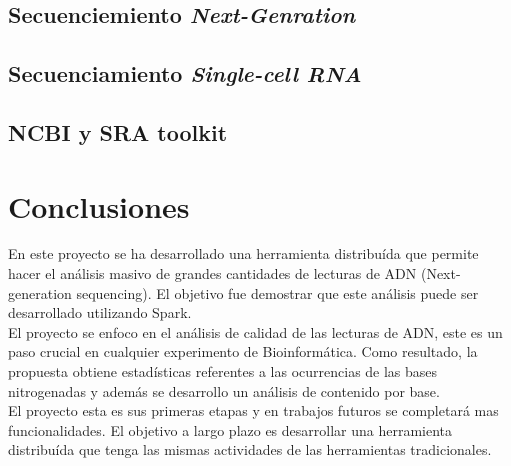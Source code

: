 \documentclass{article}
\begin{document}
\subsection{Secuenciemiento \textit{Next-Genration}}

\subsection{ Secuenciamiento \textit{Single-cell RNA}}

\subsection{NCBI y SRA toolkit}
	




\section{Conclusiones}

En este proyecto se ha desarrollado una herramienta distribuída que permite hacer el análisis masivo de grandes cantidades de lecturas de ADN (Next-generation sequencing). El objetivo fue demostrar que este análisis puede ser desarrollado utilizando Spark. \\

El proyecto se enfoco en el análisis de calidad de las lecturas de ADN, este es un paso crucial en cualquier experimento de Bioinformática. Como resultado, la propuesta obtiene estadísticas referentes a las ocurrencias de las bases nitrogenadas y además se desarrollo un análisis de contenido por base. \\
	
El proyecto esta es sus primeras etapas y en trabajos futuros se completará mas funcionalidades. El objetivo a largo plazo es desarrollar una herramienta distribuída que tenga las mismas actividades de las herramientas tradicionales.


%


	
	
	
	
\end{document}
